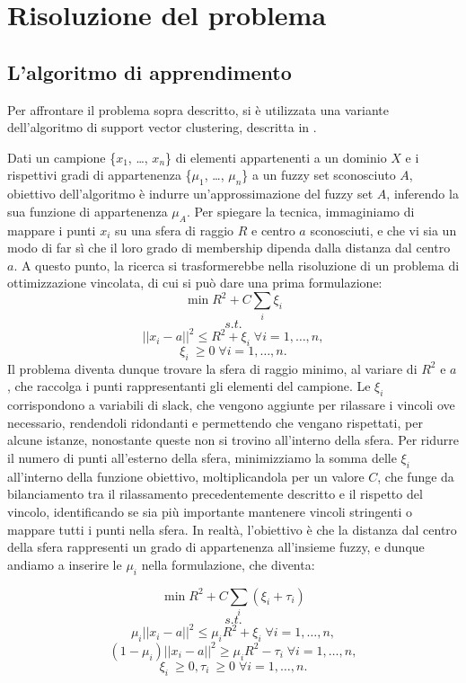 \documentclass[12pt,a4paper]{report}
\begin{document}
\chapter{Risoluzione del problema}
\section{L'algoritmo di apprendimento}\label{algorithmParagraph}
Per affrontare il problema sopra descritto, si è utilizzata una variante dell'algoritmo di support vector clustering, descritta in \cite{svpaper}.

Dati un campione  \{$x_1$, \dots , $x_n$\} di elementi appartenenti a un dominio $X$ e i rispettivi gradi di appartenenza  \{$\mu_1$, \dots , $\mu_n$\}  a un fuzzy set sconosciuto $A$, obiettivo dell'algoritmo è indurre un'approssimazione del fuzzy set $A$,  inferendo la sua funzione di appartenenza $\mu_A$. Per spiegare la tecnica, immaginiamo di mappare i punti  $x_i$ su una sfera di raggio $R$  e centro $a$ sconosciuti, e che vi sia un modo di far sì che il  loro  grado di membership dipenda dalla distanza dal centro $a$.
A questo punto, la ricerca si trasformerebbe nella risoluzione di un problema di ottimizzazione vincolata, di cui si può dare una prima formulazione:
\[ \min R^2 + C\sum_{i} \xi_{i}\]
\[s.t.\]
\[||x_i - a||^2  \leq R^2 + \xi_{i} \; \forall i = 1, \dots, n,\]
\[ \xi_{i}\ \geq 0 \; \forall i = 1, \dots, n.\]
Il problema diventa dunque trovare la sfera di raggio minimo, al variare di $R^2$ e $a$, che raccolga i punti rappresentanti gli elementi del campione.  
Le $\xi_i$ corrispondono a variabili di slack, che vengono aggiunte per rilassare i vincoli ove necessario, rendendoli ridondanti e permettendo che vengano rispettati, per alcune istanze, nonostante queste non si trovino all'interno della sfera. Per ridurre il numero di punti all'esterno della sfera, minimizziamo la somma delle $\xi_i$ all'interno della funzione obiettivo, moltiplicandola per un valore $C$, che funge da bilanciamento tra il rilassamento precedentemente descritto e il rispetto del vincolo, identificando se sia più importante mantenere vincoli stringenti o mappare tutti i punti nella sfera.
In realtà, l'obiettivo è che la distanza dal centro della sfera rappresenti un grado di appartenenza all'insieme fuzzy, e dunque andiamo a inserire le $\mu_i$ nella formulazione, che diventa:

\[\min R^2 + C\sum_{i} (\xi_{i} + \tau_{i})\]
\[s.t.\]
\[ \mu_i||x_i - a||^2  \leq \mu_i R^2 + \xi_{i} \; \forall i = 1, \dots, n,\]
\[ (1 - \mu_i)||x_i - a||^2  \geq \mu_i R^2 - \tau_{i}  \; \forall i = 1, \dots, n,\]
\[ \xi_{i}\ \geq 0, \tau_{i}\ \geq 0  \; \forall i = 1, \dots, n.\]
\end{document}
